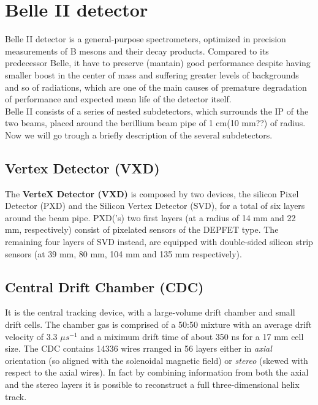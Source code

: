 

\newpage



\section{Belle II detector}

Belle II detector is a general-purpose spectrometers, optimized in precision measurements of B mesons and their decay products. Compared to its predecessor Belle, it have to preserve (mantain) good performance despite having smaller boost in the center of mass and suffering greater levels of backgrounds and so of radiations, which are one of the main causes of premature degradation of performance and expected mean life of the detector itself.\\

Belle II consists of a series of nested subdetectors, which surrounds the IP of the two beams, placed around the berillium beam pipe of 1 cm(10 mm??) of radius. Now we will go trough a briefly description of the several subdetectors. 


\subsection{Vertex Detector (VXD)}

The \textbf{VerteX Detector (VXD)} is composed by two devices, the silicon Pixel Detector (PXD) and the Silicon Vertex Detector (SVD), for a total of six layers around the beam pipe.
PXD('s) two first layers (at a radius of 14 mm and 22 mm, respectively) consist of pixelated sensors of the DEPFET type. The remaining four layers of SVD instead, are equipped with double-sided silicon strip sensors (at 39 mm, 80 mm, 104 mm and 135 mm respectively). 

\subsection{Central Drift Chamber (CDC)}

It is the central tracking device, with a large-volume drift chamber and small drift cells. The chamber gas is comprised of a  50:50 mixture with an average drift velocity of 3.3 $\mu s^{-1}$ and a miximum drift time of about 350 ns for a 17 mm cell size.
The CDC contains 14336 wires rranged in 56 layers either in \textit{axial} orientation (so aligned with the solenoidal magnetic field) or \textit{stereo} (skewed with respect to the axial wires). In fact by combining information from both the axial and the stereo layers it is possible to reconstruct a full three-dimensional helix track.


